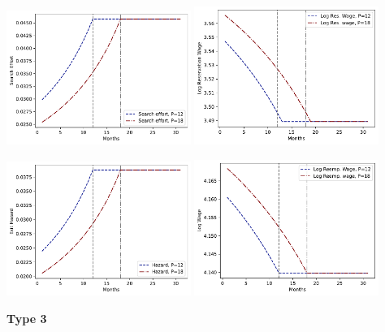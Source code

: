 \documentclass[letter, 10pt]{article}
\begin{document}
\includegraphics[clip=true,trim=0cm 0cm 0cm 0cm,width = 0.45\textwidth]{figures_Est1_compiled/fig_type2_s.pdf} 
\includegraphics[clip=true,trim=0cm 0cm 0cm 0cm,width = 0.45\textwidth]{figures_Est1_compiled/fig_type2_phi.pdf} 

\includegraphics[clip=true,trim=0cm 0cm 0cm 0cm,width = 0.45\textwidth]{figures_Est1_compiled/fig_type2_hazard.pdf} 
\includegraphics[clip=true,trim=0cm 0cm 0cm 0cm,width = 0.45\textwidth]{figures_Est1_compiled/fig_type2_w.pdf} 

\pagebreak 
 \textbf{Type 3} 
 
\end{document}
